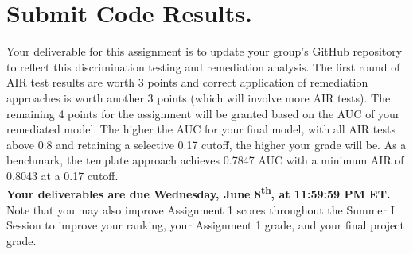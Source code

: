 \documentclass[fleqn]{article}
\begin{document}
\section{Submit Code Results.}

Your deliverable for this assignment is to update your group's GitHub repository to reflect this discrimination testing and remediation analysis. The first round of AIR test results are worth 3 points and correct application of remediation approaches is worth another 3 points (which will involve more AIR tests). The remaining 4 points for the assignment will be granted based on the AUC of your remediated model. The higher the AUC for your final model, with all AIR tests above 0.8 and retaining a selective 0.17 cutoff, the higher your grade will be. As a benchmark, the template approach achieves 0.7847 AUC with a minimum AIR of 0.8043 at a 0.17 cutoff.\\

\noindent \textbf{Your deliverables are due Wednesday, June 8\textsuperscript{th}, at 11:59:59 PM ET.}\\

\noindent Note that you may also improve Assignment 1 scores throughout the Summer I Session to improve your ranking, your Assignment 1 grade, and your final project grade.
\end{document}
